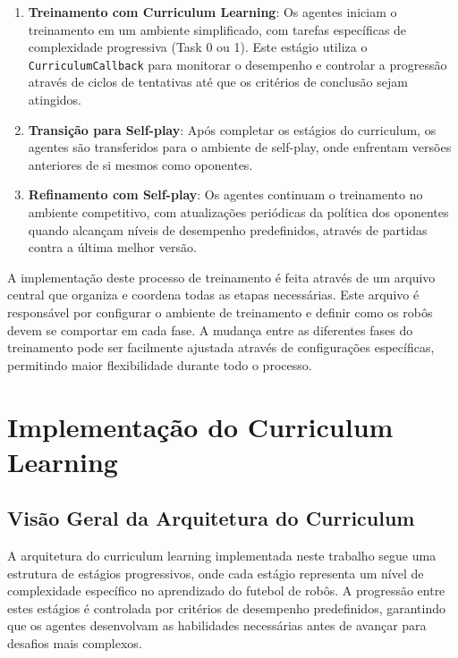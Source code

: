 \begin{enumerate}
    \item \textbf{Treinamento com Curriculum Learning}: Os agentes iniciam o treinamento em um ambiente simplificado, com tarefas específicas de complexidade progressiva (Task 0 ou 1). Este estágio utiliza o \texttt{CurriculumCallback} para monitorar o desempenho e controlar a progressão através de ciclos de tentativas até que os critérios de conclusão sejam atingidos.
    
    \item \textbf{Transição para Self-play}: Após completar os estágios do curriculum, os agentes são transferidos para o ambiente de self-play, onde enfrentam versões anteriores de si mesmos como oponentes.
    
    \item \textbf{Refinamento com Self-play}: Os agentes continuam o treinamento no ambiente competitivo, com atualizações periódicas da política dos oponentes quando alcançam níveis de desempenho predefinidos, através de partidas contra a última melhor versão.
\end{enumerate}

A implementação deste processo de treinamento é feita através de um arquivo central que organiza e coordena todas as etapas necessárias. Este arquivo é responsável por configurar o ambiente de treinamento e definir como os robôs devem se comportar em cada fase. A mudança entre as diferentes fases do treinamento pode ser facilmente ajustada através de configurações específicas, permitindo maior flexibilidade durante todo o processo.

\section{Implementação do Curriculum Learning}
\label{sec:implementacao_cl}

\subsection{Visão Geral da Arquitetura do Curriculum}

A arquitetura do curriculum learning implementada neste trabalho segue uma estrutura de estágios progressivos, onde cada estágio representa um nível de complexidade específico no aprendizado do futebol de robôs. A progressão entre estes estágios é controlada por critérios de desempenho predefinidos, garantindo que os agentes desenvolvam as habilidades necessárias antes de avançar para desafios mais complexos.


